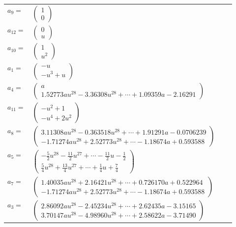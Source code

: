 \documentclass[1p]{elsarticle_modified}
\theoremstyle{definition}
\begin{document}
\begin{tabular}{m{7pt} m{180pt} m{7pt} m{180pt} }
\flushright $a_{9}=$&$\begin{pmatrix}1\\0\end{pmatrix}$ \\
\flushright $a_{12}=$&$\begin{pmatrix}0\\u\end{pmatrix}$ \\
\flushright $a_{10}=$&$\begin{pmatrix}1\\u^2\end{pmatrix}$ \\
\flushright $a_{1}=$&$\begin{pmatrix}- u\\- u^3+u\end{pmatrix}$ \\
\flushright $a_{4}=$&$\begin{pmatrix}a\\1.52773 a u^{28}-3.36308 u^{28}+\cdots+1.09359 a-2.16291\end{pmatrix}$ \\
\flushright $a_{11}=$&$\begin{pmatrix}- u^2+1\\- u^4+2 u^2\end{pmatrix}$ \\
\flushright $a_{8}=$&$\begin{pmatrix}3.11308 a u^{28}-0.363518 u^{28}+\cdots+1.91291 a-0.0706239\\-1.71274 a u^{28}+2.52773 u^{28}+\cdots-1.18674 a+0.593588\end{pmatrix}$ \\
\flushright $a_{5}=$&$\begin{pmatrix}-\frac{5}{2} u^{28}-\frac{11}{2} u^{27}+\cdots-\frac{11}{2} u-\frac{1}{2}\\\frac{5}{4} u^{28}+\frac{13}{4} u^{27}+\cdots+\frac{1}{4} u+\frac{7}{4}\end{pmatrix}$ \\
\flushright $a_{7}=$&$\begin{pmatrix}1.40035 a u^{28}+2.16421 u^{28}+\cdots+0.726170 a+0.522964\\-1.71274 a u^{28}+2.52773 u^{28}+\cdots-1.18674 a+0.593588\end{pmatrix}$ \\
\flushright $a_{3}=$&$\begin{pmatrix}2.86092 a u^{28}-2.45234 u^{28}+\cdots+2.62435 a-3.15165\\3.70147 a u^{28}-4.98960 u^{28}+\cdots+2.58622 a-3.71490\end{pmatrix}$ \\

\end{tabular}
\end{document}
